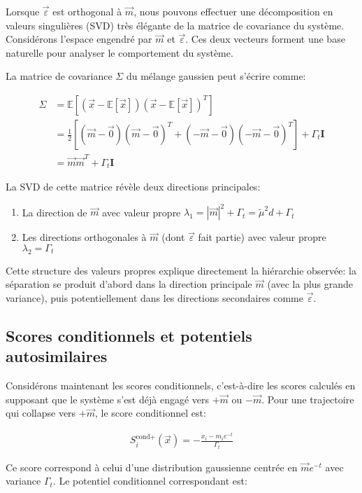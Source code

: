 \documentclass[11pt,a4paper]{article}
\begin{document}
Lorsque $\vec{\varepsilon}$ est orthogonal à $\vec{m}$, nous pouvons effectuer une décomposition en valeurs singulières (SVD) très élégante de la matrice de covariance du système. Considérons l'espace engendré par $\vec{m}$ et $\vec{\varepsilon}$. Ces deux vecteurs forment une base naturelle pour analyser le comportement du système.

La matrice de covariance $\Sigma$ du mélange gaussien peut s'écrire comme:

\begin{align}
\Sigma &= \mathbb{E}[(\vec{x}-\mathbb{E}[\vec{x}])(\vec{x}-\mathbb{E}[\vec{x}])^T] \\
&= \frac{1}{2}\left[ (\vec{m}-\vec{0})(\vec{m}-\vec{0})^T + (-\vec{m}-\vec{0})(-\vec{m}-\vec{0})^T \right] + \Gamma_t \mathbf{I} \\
&= \vec{m}\vec{m}^T + \Gamma_t \mathbf{I}
\end{align}

La SVD de cette matrice révèle deux directions principales:
\begin{enumerate}
    \item La direction de $\vec{m}$ avec valeur propre $\lambda_1 = |\vec{m}|^2 + \Gamma_t = \tilde{\mu}^2 d + \Gamma_t$
    \item Les directions orthogonales à $\vec{m}$ (dont $\vec{\varepsilon}$ fait partie) avec valeur propre $\lambda_2 = \Gamma_t$
\end{enumerate}

Cette structure des valeurs propres explique directement la hiérarchie observée: la séparation se produit d'abord dans la direction principale $\vec{m}$ (avec la plus grande variance), puis potentiellement dans les directions secondaires comme $\vec{\varepsilon}$.

\subsection{Scores conditionnels et potentiels autosimilaires}

Considérons maintenant les scores conditionnels, c'est-à-dire les scores calculés en supposant que le système s'est déjà engagé vers $+\vec{m}$ ou $-\vec{m}$. Pour une trajectoire qui collapse vers $+\vec{m}$, le score conditionnel est:

\begin{align}
S_i^{\text{cond}+}(\vec{x}) = -\frac{x_i - m_i e^{-t}}{\Gamma_t}
\end{align}

Ce score correspond à celui d'une distribution gaussienne centrée en $\vec{m}e^{-t}$ avec variance $\Gamma_t$. Le potentiel conditionnel correspondant est:
\end{document}
